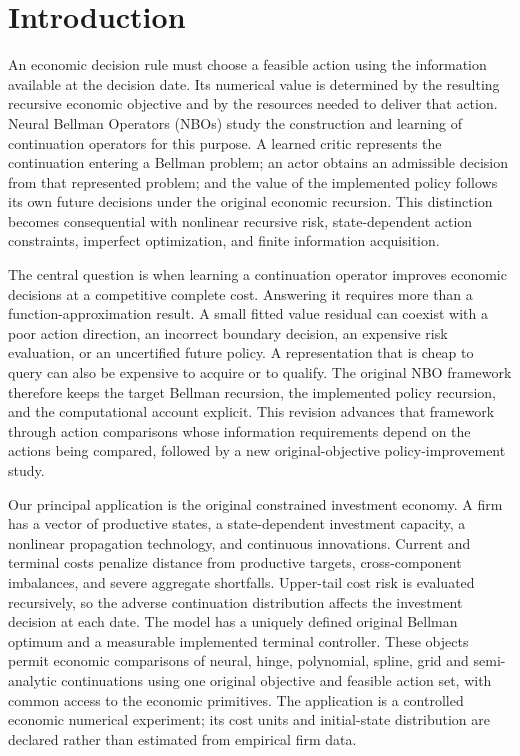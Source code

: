 \section{Introduction}\label{sec:intro120}
An economic decision rule must choose a feasible action using the information
available at the decision date. Its numerical value is determined by the
resulting recursive economic objective and by the resources needed to deliver
that action. Neural Bellman Operators (NBOs) study the construction and learning
of continuation operators for this purpose. A learned critic represents the
continuation entering a Bellman problem; an actor obtains an admissible decision
from that represented problem; and the value of the implemented policy follows
its own future decisions under the original economic recursion. This distinction
becomes consequential with nonlinear recursive risk, state-dependent action
constraints, imperfect optimization, and finite information acquisition.

The central question is when learning a continuation operator improves economic
decisions at a competitive complete cost. Answering it requires more than a
function-approximation result. A small fitted value residual can coexist with a
poor action direction, an incorrect boundary decision, an expensive risk
evaluation, or an uncertified future policy. A representation that is cheap to
query can also be expensive to acquire or to qualify. The original NBO framework
therefore keeps the target Bellman recursion, the implemented policy recursion,
and the computational account explicit. This revision advances that framework
through action comparisons whose information requirements depend on the actions
being compared, followed by a new original-objective policy-improvement study.

Our principal application is the original constrained investment economy.
A firm has a vector of productive states, a state-dependent investment capacity,
a nonlinear propagation technology, and continuous innovations. Current and
terminal costs penalize distance from productive targets, cross-component
imbalances, and severe aggregate shortfalls. Upper-tail cost risk is evaluated
recursively, so the adverse continuation distribution affects the investment
decision at each date. The model has a uniquely defined original Bellman optimum and a
measurable implemented terminal controller. These objects permit economic
comparisons of neural, hinge, polynomial, spline, grid and semi-analytic
continuations using one original objective and feasible action set, with common
access to the economic primitives. The application is a controlled economic
numerical experiment; its cost
units and initial-state distribution are declared rather than estimated from
empirical firm data.


